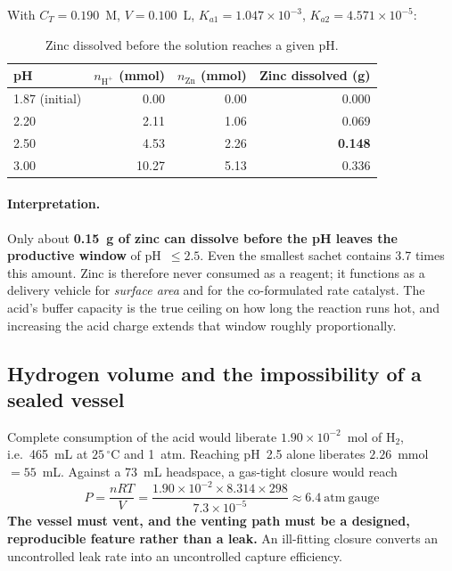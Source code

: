 \documentclass[11pt,a4paper]{article}
\begin{document}
With $C_T = 0.190$~M, $V = 0.100$~L, $K_{a1} = 1.047\times10^{-3}$,
$K_{a2} = 4.571\times10^{-5}$:

\begin{table}[h]
\centering
\caption{Zinc dissolved before the solution reaches a given pH.}
\begin{tabular}{lrrr}
\toprule
pH & $n_{\mathrm{H^+}}$ (mmol) & $n_{\mathrm{Zn}}$ (mmol)
   & Zinc dissolved (g) \\
\midrule
1.87 (initial) & 0.00 & 0.00 & 0.000 \\
2.20 & 2.11 & 1.06 & 0.069 \\
2.50 & 4.53 & 2.26 & \textbf{0.148} \\
3.00 & 10.27 & 5.13 & 0.336 \\
\bottomrule
\end{tabular}
\end{table}

\paragraph{Interpretation.} Only about \textbf{0.15~g of zinc can dissolve
before the pH leaves the productive window} of pH~$\leq 2.5$. Even the
smallest sachet contains 3.7 times this amount. Zinc is therefore never
consumed as a reagent; it functions as a delivery vehicle for
\emph{surface area} and for the co-formulated rate catalyst. The acid's
buffer capacity is the true ceiling on how long the reaction runs hot, and
increasing the acid charge extends that window roughly proportionally.

\subsection{Hydrogen volume and the impossibility of a sealed vessel}

Complete consumption of the acid would liberate
$1.90\times10^{-2}$~mol of H$_2$, i.e.\ 465~mL at $25\,^\circ$C and 1~atm.
Reaching pH~2.5 alone liberates $2.26$~mmol $=55$~mL. Against a 73~mL
headspace, a gas-tight closure would reach
\begin{equation}
  P = \frac{nRT}{V} = \frac{1.90\times10^{-2}\times 8.314 \times 298}
  {7.3\times10^{-5}} \approx 6.4\ \mathrm{atm\ gauge}
\end{equation}
\textbf{The vessel must vent, and the venting path must be a designed,
reproducible feature rather than a leak.} An ill-fitting closure converts an
uncontrolled leak rate into an uncontrolled capture efficiency.
\end{document}
